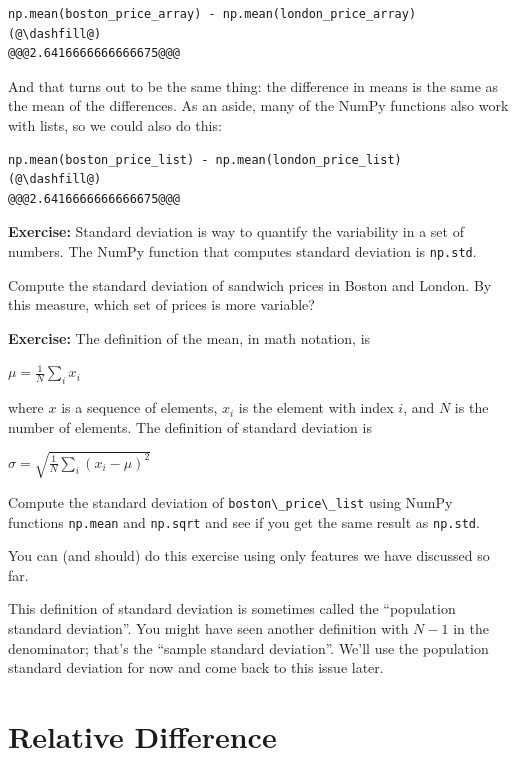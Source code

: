 \begin{lstlisting}[]
np.mean(boston_price_array) - np.mean(london_price_array)
(@\dashfill@)
@@@2.6416666666666675@@@
\end{lstlisting}

And that turns out to be the same thing: the difference in means is the
same as the mean of the differences. As an aside, many of the NumPy
functions also work with lists, so we could also do this:

\begin{lstlisting}[]
np.mean(boston_price_list) - np.mean(london_price_list)
(@\dashfill@)
@@@2.6416666666666675@@@
\end{lstlisting}

\textbf{Exercise:} Standard deviation is way to quantify the variability
in a set of numbers. The NumPy function that computes standard deviation
is \passthrough{\lstinline!np.std!}.

Compute the standard deviation of sandwich prices in Boston and London.
By this measure, which set of prices is more variable?

\textbf{Exercise:} The definition of the mean, in math notation, is

\(\mu = \frac{1}{N} \sum_i x_i\)

where \(x\) is a sequence of elements, \(x_i\) is the element with index
\(i\), and \(N\) is the number of elements. The definition of standard
deviation is

\(\sigma = \sqrt{\frac{1}{N} \sum_i (x_i - \mu)^2}\)

Compute the standard deviation of
\passthrough{\lstinline!boston\_price\_list!} using NumPy functions
\passthrough{\lstinline!np.mean!} and \passthrough{\lstinline!np.sqrt!}
and see if you get the same result as \passthrough{\lstinline!np.std!}.

You can (and should) do this exercise using only features we have
discussed so far.

This definition of standard deviation is sometimes called the
``population standard deviation''. You might have seen another
definition with \(N-1\) in the denominator; that's the ``sample standard
deviation''. We'll use the population standard deviation for now and
come back to this issue later.

\hypertarget{relative-difference}{%
\section{Relative Difference}\label{relative-difference}}

